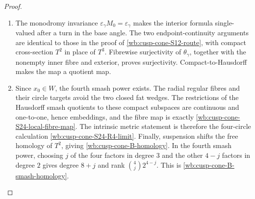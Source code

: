 \begin{proof}
\begin{enumerate}[label=\arabic*.,leftmargin=*]
\item The monodromy invariance
\(\varepsilon_\gamma M_0=\varepsilon_\gamma\) makes the interior formula
single-valued after a turn in the base angle.  The two endpoint-continuity
arguments are identical to those in the proof of
\cref{wb:cusp-cone-S12-route}, with compact cross-section \(T^2\) in place of
\(T^3\).  Fibrewise surjectivity of \(\theta_\gamma\), together with the
nonempty inner fibre and exterior, proves surjectivity.  Compact-to-Hausdorff
makes the map a quotient map.

\item Since \(x_0\in W\), the fourth smash power exists.  The radial regular
fibres and their circle targets avoid the two closed fat wedges.  The
restrictions of the Hausdorff smash quotients to these compact subspaces are
continuous and one-to-one, hence embeddings, and the fibre map is exactly
\cref{wb:cusp-cone-S24-local-fibre-map}.  The intrinsic metric statement is
therefore the four-circle calculation
\cref{wb:cusp-cone-S24-R4-limit}.  Finally, suspension shifts the free homology
of \(T^2\), giving \cref{wb:cusp-cone-B-homology}.  In the fourth smash power,
choosing \(j\) of the four factors in degree \(3\) and the other
\(4-j\) factors in degree \(2\) gives degree \(8+j\) and rank
\(\binom4j2^{4-j}\).  This is \cref{wb:cusp-cone-B-smash-homology}.
\end{enumerate}
\end{proof}

